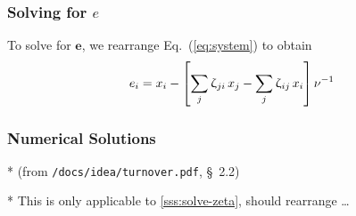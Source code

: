\documentclass{article}
\numberwithin{equation}{section}
\newcommand{\eq}[1]{Eq.~(\ref{#1})}
\renewcommand{\zeta}{\upzeta}
\begin{document}
\subsubsection{Solving for $e$}\label{sss:solve-e}
To solve for $\bm{e}$, we rearrange \eq{eq:system} to obtain
\begin{equation}\label{eq:system-e}
e_i = x_i - \left[ \sum_{j}{\zeta_{ji} \thinspace x_j}
                 - \sum_{j}{\zeta_{ij} \thinspace x_i} \right] \nu^{-1}
\end{equation}
\subsubsection{Numerical Solutions}
* (from \texttt{/docs/idea/turnover.pdf}, \S~2.2)
\par
* This is only applicable to \ref{sss:solve-zeta}, should rearrange \dots
\end{document}
